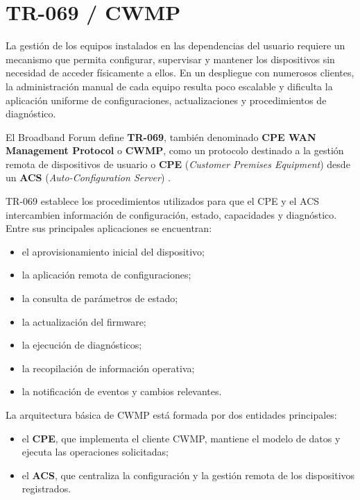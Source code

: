 \section{TR-069 / CWMP}
\label{sec:tr-069-cwmp}

La gestión de los equipos instalados en las dependencias del usuario
requiere un mecanismo que permita configurar, supervisar y mantener los
dispositivos sin necesidad de acceder físicamente a ellos. En un
despliegue con numerosos clientes, la administración manual de cada
equipo resulta poco escalable y dificulta la aplicación uniforme de
configuraciones, actualizaciones y procedimientos de diagnóstico.

El Broadband Forum define \textbf{TR-069}, también denominado
\textbf{CPE WAN Management Protocol} o \textbf{CWMP}, como un protocolo
destinado a la gestión remota de dispositivos de usuario o
\textbf{CPE} (\textit{Customer Premises Equipment}) desde un
\textbf{ACS} (\textit{Auto-Configuration Server})
\cite{bbf_tr069}.

TR-069 establece los procedimientos utilizados para que el CPE y el ACS
intercambien información de configuración, estado, capacidades y
diagnóstico. Entre sus principales aplicaciones se encuentran:

\begin{itemize}
    \item el aprovisionamiento inicial del dispositivo;
    \item la aplicación remota de configuraciones;
    \item la consulta de parámetros de estado;
    \item la actualización del firmware;
    \item la ejecución de diagnósticos;
    \item la recopilación de información operativa;
    \item la notificación de eventos y cambios relevantes.
\end{itemize}

La arquitectura básica de CWMP está formada por dos entidades
principales:

\begin{itemize}
    \item el \textbf{CPE}, que implementa el cliente CWMP, mantiene el
    modelo de datos y ejecuta las operaciones solicitadas;

    \item el \textbf{ACS}, que centraliza la configuración y la gestión
    remota de los dispositivos registrados.
\end{itemize}

